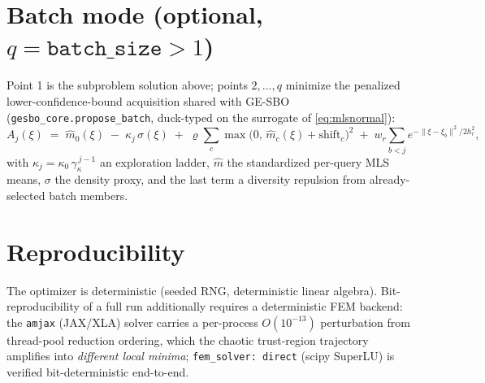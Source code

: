 \documentclass[11pt,a4paper]{article}
\newcommand{\code}[1]{\texttt{#1}}
\newcommand{\xxi}{\xi}
\begin{document}
\section{Batch mode (optional, $q = \code{batch\_size} > 1$)}
\label{sec:batch}
Point 1 is the subproblem solution above; points $2,\dots,q$ minimize the
penalized lower-confidence-bound acquisition shared with GE-SBO
(\code{gesbo\_core.propose\_batch}, duck-typed on the surrogate of
\eqref{eq:mlsnormal}):
\begin{equation}
A_j(\xxi) \;=\; \hat m_0(\xxi) \;-\; \kappa_j\, \sigma(\xxi)
\;+\; \varrho \sum_{c} \max\bigl(0,\, \hat m_c(\xxi) + \mathrm{shift}_c\bigr)^2
\;+\; w_r \sum_{b<j} e^{-\lVert \xxi - \xxi_b \rVert^2 / 2 h_r^2},
\end{equation}
with $\kappa_j = \kappa_0\, \gamma_\kappa^{\,j-1}$ an exploration ladder,
$\hat m$ the standardized per-query MLS means, $\sigma$ the density proxy,
and the last term a diversity repulsion from already-selected batch members.

\section{Reproducibility}
The optimizer is deterministic (seeded RNG, deterministic linear algebra).
Bit-reproducibility of a full run additionally requires a deterministic FEM
backend: the \code{amjax} (JAX/XLA) solver carries a per-process
$O(10^{-13})$ perturbation from thread-pool reduction ordering, which the
chaotic trust-region trajectory amplifies into \emph{different local minima};
\code{fem\_solver: direct} (scipy SuperLU) is verified bit-deterministic
end-to-end.
\end{document}
